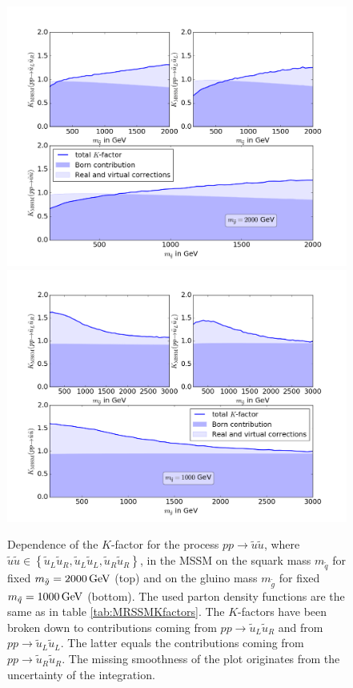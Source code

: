 \begin{figure}[!htpb]
\begin{center}
\includegraphics[scale=.46]{figures/MSSM_uu_susu_Kfactors_msg=2000GeV.png}
\includegraphics[scale=.46]{figures/MSSM_uu_susu_Kfactors_msq=1000GeV.png}
\caption{Dependence of the $K$-factor for the process $pp \to \tilde{u}\tilde{u}$, where $\tilde{u}\tilde{u} \in \left\{ \tilde{u}_L\tilde{u}_R, \tilde{u}_L\tilde{u}_L, \tilde{u}_R\tilde{u}_R \right\}$, in the MSSM on the squark mass $m_{\tilde{q}}$ for fixed $m_{\tilde{g}} = \unit[2000]{GeV}$ (top) and on the gluino mass $m_{\tilde{g}}$ for fixed $m_{\tilde{q}} = \unit[1000]{GeV}$ (bottom). The used parton density functions are the same as in table \ref{tab:MRSSMKfactors}. The $K$-factors have been broken down to contributions coming from $pp \to \tilde{u}_L\tilde{u}_R$ and from $pp \to \tilde{u}_L\tilde{u}_L$. The latter equals the contributions coming from $pp \to \tilde{u}_R\tilde{u}_R$. The missing smoothness of the plot originates from the uncertainty of the integration.}\label{fig:1LXsection_fixed_m_MSSM}
\end{center}
\end{figure}
